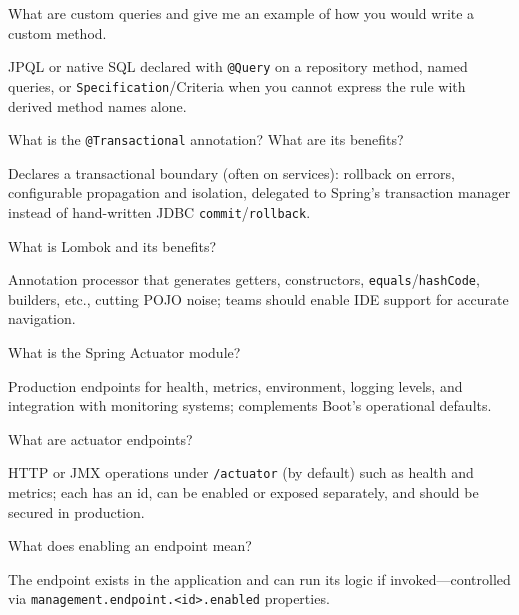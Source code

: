 \question[4]
What are custom queries and give me an example of how you would write a custom method.
\makeemptybox{1.45in}
\begin{solution}
  JPQL or native SQL declared with \texttt{@Query} on a repository method, named queries, or \texttt{Specification}/Criteria when you cannot express the rule with derived method names alone.
\end{solution}

\question[4]
What is the \texttt{@Transactional} annotation? What are its benefits?
\makeemptybox{1.35in}
\begin{solution}
  Declares a transactional boundary (often on services): rollback on errors, configurable propagation and isolation, delegated to Spring's transaction manager instead of hand-written JDBC \texttt{commit}/\texttt{rollback}.
\end{solution}

\newpage


\question[4]
What is Lombok and its benefits?
\makeemptybox{1.25in}
\begin{solution}
  Annotation processor that generates getters, constructors, \texttt{equals}/\texttt{hashCode}, builders, etc., cutting POJO noise; teams should enable IDE support for accurate navigation.
\end{solution}

\question[4]
What is the Spring Actuator module?
\makeemptybox{1.2in}
\begin{solution}
  Production endpoints for health, metrics, environment, logging levels, and integration with monitoring systems; complements Boot's operational defaults.
\end{solution}

\question[4]
What are actuator endpoints?
\makeemptybox{1.1in}
\begin{solution}
  HTTP or JMX operations under \texttt{/actuator} (by default) such as health and metrics; each has an id, can be enabled or exposed separately, and should be secured in production.
\end{solution}

\question[4]
What does enabling an endpoint mean?
\makeemptybox{1.05in}
\begin{solution}
  The endpoint exists in the application and can run its logic if invoked---controlled via \texttt{management.endpoint.<id>.enabled} properties.
\end{solution}


